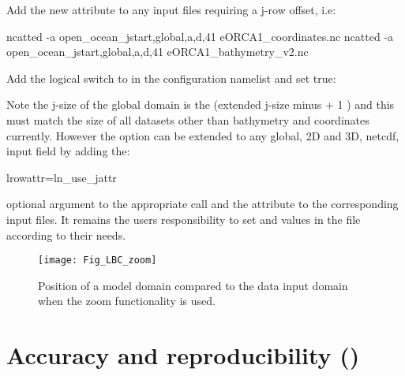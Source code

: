 \documentclass[../main/NEMO_manual]{subfiles}
\begin{document}
\noindent Add the new attribute to any input files requiring a j-row offset, i.e:
\vspace{-10pt}
\begin{cmds}
ncatted  -a open_ocean_jstart,global,a,d,41 eORCA1_coordinates.nc 
ncatted  -a open_ocean_jstart,global,a,d,41 eORCA1_bathymetry_v2.nc
\end{cmds}
 
\noindent Add the logical switch to  in the configuration namelist and set true:


\noindent Note the j-size of the global domain is the (extended j-size minus  + 1 ) and
this must match the size of all datasets other than bathymetry and coordinates currently.
However the option can be extended to any global, 2D and 3D, netcdf, input field by adding the:
\vspace{-10pt}
\begin{forlines}
lrowattr=ln_use_jattr
\end{forlines}
optional argument to the appropriate  call and the  attribute to
the corresponding input files.
It remains the users responsibility to set  and  values in
the  file according to their needs.

\begin{figure}[!ht]
  \begin{center}
    \texttt{[image: Fig\_LBC\_zoom]}
    \caption{
      \protect\label{fig:LBC_zoom}
      Position of a model domain compared to the data input domain when the zoom functionality is used.
    }
  \end{center}
\end{figure}


\section{Accuracy and reproducibility (\protect{})}
\label{sec:MISC_fortran}
\end{document}
